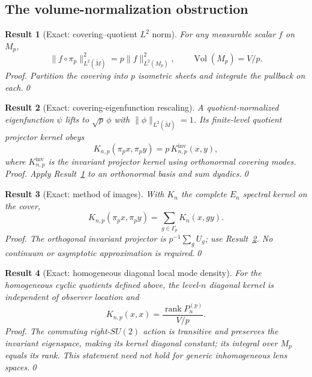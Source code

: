 \documentclass[aps,prd,onecolumn,notitlepage,groupedaddress,11pt]{revtex4-2}
\newtheorem{result}{Result}
\begin{document}
\subsection{The volume-normalization obstruction}
\begin{result}[\textsf{Exact}: covering--quotient $L^2$ norm]\label{new:109}
For any measurable scalar $f$ on $M_p$,
\begin{equation}\label{new:eq109}
\|f\circ\pi_p\|_{L^2(\widetilde M)}^2=p\|f\|_{L^2(M_p)}^2,\qquad \operatorname{Vol}(M_p)=V/p.
\end{equation}
\textit{Proof.} Partition the covering into $p$ isometric sheets and integrate the pullback on each.\qed
\end{result}
\begin{result}[\textsf{Exact}: covering-eigenfunction rescaling]\label{new:110}
A quotient-normalized eigenfunction $\psi$ lifts to $\sqrt p\,\phi$ with $\|\phi\|_{L^2(\widetilde M)}=1$. Its finite-level quotient projector kernel obeys
\begin{equation}\label{new:eq110}
K_{n,p}(\pi_px,\pi_py)=p\,K^{\mathrm{inv}}_{n,p}(x,y),
\end{equation}
where $K^{\mathrm{inv}}_{n,p}$ is the invariant projector kernel using orthonormal covering modes. \textit{Proof.} Apply Result~\ref{new:109} to an orthonormal basis and sum dyadics.\qed
\end{result}
\begin{result}[\textsf{Exact}: method of images]\label{new:111}
With $K_n$ the complete $E_n$ spectral kernel on the cover,
\begin{equation}\label{new:eq111}
K_{n,p}(\pi_px,\pi_py)=\sum_{g\in\Gamma_p}K_n(x,gy).
\end{equation}
\textit{Proof.} The orthogonal invariant projector is $p^{-1}\sum_{g}U_g$; use Result~\ref{new:110}. No continuum or asymptotic approximation is required.\qed
\end{result}
\begin{result}[\textsf{Exact}: homogeneous diagonal local mode density]\label{new:112}
For the homogeneous cyclic quotients defined above, the level-$n$ diagonal kernel is independent of observer location and
\begin{equation}\label{new:eq112}
K_{n,p}(x,x)=\frac{\operatorname{rank}P_n^{(p)}}{V/p}.
\end{equation}
\textit{Proof.} The commuting right-$SU(2)$ action is transitive and preserves the invariant eigenspace, making its kernel diagonal constant; its integral over $M_p$ equals its rank. This statement need not hold for generic inhomogeneous lens spaces.\qed
\end{result}
\end{document}
